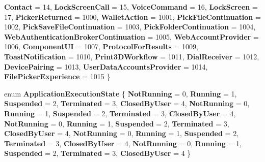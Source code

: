 \begin{DoxyCompactItemize}
{\bfseries Contact} = 14, 
{\bfseries Lock\+Screen\+Call} = 15, 
\newline
{\bfseries Voice\+Command} = 16, 
{\bfseries Lock\+Screen} = 17, 
{\bfseries Picker\+Returned} = 1000, 
{\bfseries Wallet\+Action} = 1001, 
\newline
{\bfseries Pick\+File\+Continuation} = 1002, 
{\bfseries Pick\+Save\+File\+Continuation} = 1003, 
{\bfseries Pick\+Folder\+Continuation} = 1004, 
{\bfseries Web\+Authentication\+Broker\+Continuation} = 1005, 
\newline
{\bfseries Web\+Account\+Provider} = 1006, 
{\bfseries Component\+UI} = 1007, 
{\bfseries Protocol\+For\+Results} = 1009, 
{\bfseries Toast\+Notification} = 1010, 
\newline
{\bfseries Print3\+D\+Workflow} = 1011, 
{\bfseries Dial\+Receiver} = 1012, 
{\bfseries Device\+Pairing} = 1013, 
{\bfseries User\+Data\+Accounts\+Provider} = 1014, 
\newline
{\bfseries File\+Picker\+Experience} = 1015
 \}
\item 
\mbox{\label{namespace_windows_1_1_application_model_1_1_activation_a03c52b98bf1430c4332252ef7e86b265}} 
enum {\bfseries Application\+Execution\+State} \{ \newline
{\bfseries Not\+Running} = 0, 
{\bfseries Running} = 1, 
{\bfseries Suspended} = 2, 
{\bfseries Terminated} = 3, 
\newline
{\bfseries Closed\+By\+User} = 4, 
{\bfseries Not\+Running} = 0, 
{\bfseries Running} = 1, 
{\bfseries Suspended} = 2, 
\newline
{\bfseries Terminated} = 3, 
{\bfseries Closed\+By\+User} = 4, 
{\bfseries Not\+Running} = 0, 
{\bfseries Running} = 1, 
\newline
{\bfseries Suspended} = 2, 
{\bfseries Terminated} = 3, 
{\bfseries Closed\+By\+User} = 4, 
{\bfseries Not\+Running} = 0, 
\newline
{\bfseries Running} = 1, 
{\bfseries Suspended} = 2, 
{\bfseries Terminated} = 3, 
{\bfseries Closed\+By\+User} = 4, 
\newline
{\bfseries Not\+Running} = 0, 
{\bfseries Running} = 1, 
{\bfseries Suspended} = 2, 
{\bfseries Terminated} = 3, 
\newline
{\bfseries Closed\+By\+User} = 4
 \}
\item 
\mbox{\label{namespace_windows_1_1_application_model_1_1_activation_a21aa80ed65cf8b4f5d0d6c3b39f65284}} 

\end{DoxyCompactItemize}
